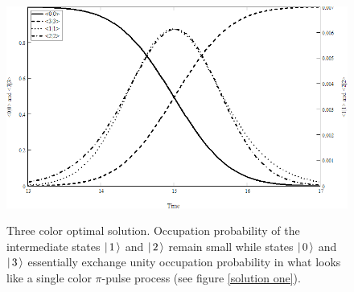 \begin{figure}
\centering
\includegraphics[width=5.00in]
{solution_3_energy_levels/solution_3_energy_levels.png}\\
\caption[Three color optimal solution]{Three color optimal solution. Occupation probability of the intermediate states $\left| \hspace{0.15em} 1 \hspace{0.15em}\right\rangle$ and $\left| \hspace{0.15em} 2 \hspace{0.15em}\right\rangle$ remain small while states $\left| \hspace{0.15em} 0 \hspace{0.15em}\right\rangle$ and $\left| \hspace{0.15em} 3 \hspace{0.15em}\right\rangle$ essentially exchange unity occupation probability in what looks like a single color $\pi$-pulse process (see figure \ref{solution one}).}
\label{solution three energy levels}
\end{figure} 
